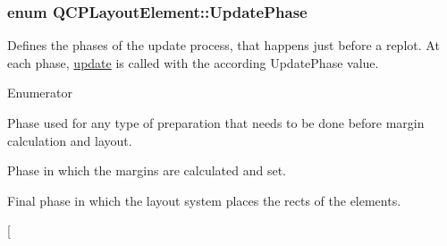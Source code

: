 \subsubsection[{\texorpdfstring{Update\+Phase}{UpdatePhase}}]{\setlength{\rightskip}{0pt plus 5cm}enum {\bf Q\+C\+P\+Layout\+Element\+::\+Update\+Phase}}\hypertarget{class_q_c_p_layout_element_a0d83360e05735735aaf6d7983c56374d}{}\label{class_q_c_p_layout_element_a0d83360e05735735aaf6d7983c56374d}
Defines the phases of the update process, that happens just before a replot. At each phase, \hyperlink{class_q_c_p_layout_element_a929c2ec62e0e0e1d8418eaa802e2af9b}{update} is called with the according Update\+Phase value. \begin{Desc}
\item[Enumerator]\par
\begin{description}
\item[{\em 
up\+Preparation\hypertarget{class_q_c_p_layout_element_a0d83360e05735735aaf6d7983c56374da9eb5d45b894ee1aa31a11e903de39ea9}{}\label{class_q_c_p_layout_element_a0d83360e05735735aaf6d7983c56374da9eb5d45b894ee1aa31a11e903de39ea9}
}]Phase used for any type of preparation that needs to be done before margin calculation and layout. \item[{\em 
up\+Margins\hypertarget{class_q_c_p_layout_element_a0d83360e05735735aaf6d7983c56374dae1924e6bd8696f20d2eb224d8084a268}{}\label{class_q_c_p_layout_element_a0d83360e05735735aaf6d7983c56374dae1924e6bd8696f20d2eb224d8084a268}
}]Phase in which the margins are calculated and set. \item[{\em 
up\+Layout\hypertarget{class_q_c_p_layout_element_a0d83360e05735735aaf6d7983c56374da9bf485ceb1c27efc5cbea2bb07ff0c4d}{}\label{class_q_c_p_layout_element_a0d83360e05735735aaf6d7983c56374da9bf485ceb1c27efc5cbea2bb07ff0c4d}
}]Final phase in which the layout system places the rects of the elements. \item[{\em 
}
\end{description}
\end{Desc}
